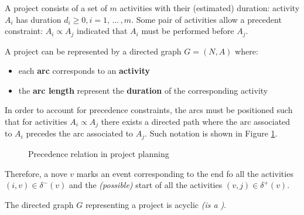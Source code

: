 \documentclass[english]{article}
\begin{document}
\begin{problem}
A project consists of a set of \(m\) activities with their (estimated) duration: activity \(A_i\) has duration \(d_i \geq 0, i = 1, \, \ldots \,, m\).
Some pair of activities allow a precedent constraint: \(A_i \propto A_j\) indicated that \(A_i\) must be performed before \(A_j\).

A project can be represented by a directed graph \(G = (N, A)\) where:
\begin{itemize}
  \item each \textbf{arc} corresponds to an \textbf{activity}
  \item the \textbf{arc length} represent the \textbf{duration} of the corresponding activity
\end{itemize}
\end{problem}

\bigskip
In order to account for precedence constraints, the arcs must be positioned such that for activities \(A_i \propto A_j\) there exists a directed path where the arc associated to \(A_i\) precedes the arc associated to \(A_j\).
Such notation is shown in Figure \ref{fig:precedence-relation-in-project-planning}.

\begin{figure}[htbp]
  \centering
  \bigskip
  \bigskip
  \caption{Precedence relation in project planning}
  \label{fig:precedence-relation-in-project-planning}
\end{figure}

Therefore, a nove \(v\) marks an event corresponding to the end fo all the activities \(\left( i, v \right) \in \delta^-(v)\) and the \textit{(possible)} start of all the activities \(\left( v, j \right) \in \delta^+(v)\).

\bigskip
\begin{property}
  The directed graph \(G\) representing a project is acyclic \textit{(is a \DAG)}.
\end{property}
\end{document}
